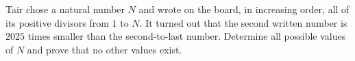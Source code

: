 Tair chose a natural number $N$ and wrote on the board, in increasing order, all of its positive divisors from $1$ to $N$. It turned out that the second written number is $2025$ times smaller than the second-to-last number. Determine all possible values of $N$ and prove that no other values exist.
